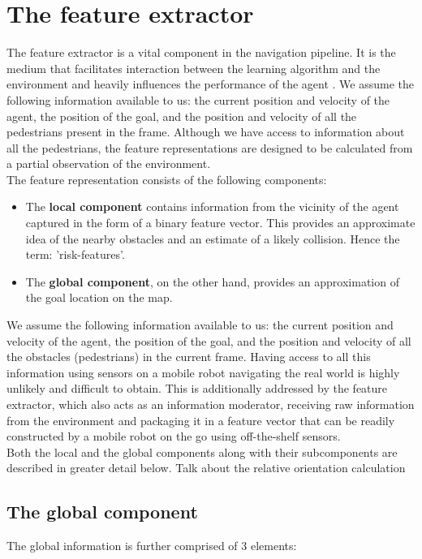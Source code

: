 \section{The feature extractor}
The feature extractor is a vital component in the navigation pipeline. It is the medium that facilitates interaction between the learning algorithm and the environment and heavily influences the performance of the agent \cite{vasquez_et_al}. We assume the following information available to us: the current position and velocity of the agent, the position of the goal, and the position and velocity of all the pedestrians present in the frame. Although we have access to information about all the pedestrians, the feature representations are designed to be calculated from a partial observation of the environment.\\
The feature representation consists of the following components:
\begin{itemize}
    \item The \textbf{local component} contains information from the vicinity of the agent captured in the form of a binary feature vector. This provides an approximate idea of the nearby obstacles and an estimate of a likely collision. Hence the term: 'risk-features'. 
    \item The \textbf{global component}, on the other hand, provides an approximation of the goal location on the map. 
\end{itemize}
 We assume the following information available to us: the current position and velocity of the agent, the position of the goal, and the position and velocity of all the obstacles (pedestrians) in the current frame.  Having access to all this information using sensors on a mobile robot navigating the real world is highly unlikely and difficult to obtain. This is additionally addressed by the feature extractor, which also acts as an information moderator, receiving raw information from the environment and packaging it in a feature vector that can be readily constructed by a mobile robot on the go using off-the-shelf sensors.\\
 Both the local and the global components along with their subcomponents are described in greater detail below.
Talk about the relative orientation calculation


\subsection*{The global component}
The global information is further comprised of 3 elements:

